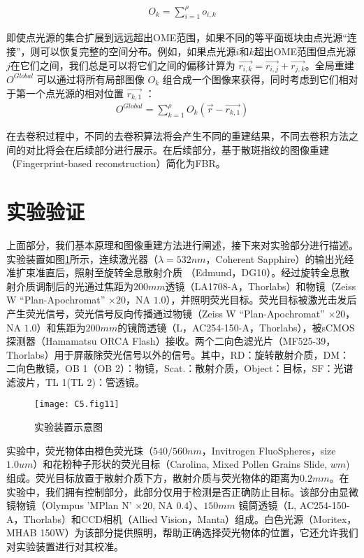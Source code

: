 \begin{equation}
		\begin{aligned}
O_{k} = \sum^{\rho}_{i=1}
o_{i,k}
\label{eq:5.5}
\end{aligned}
\end{equation}

即使点光源的集合扩展到远远超出OME范围，如果不同的等平面斑块由点光源“连接”，则可以恢复完整的空间分布。例如，如果点光源$i$和$k$超出OME范围但点光源$j$在它们之间，我们总是可以将它们之间的偏移计算为 $\vec{r_{i,k}} = \vec {r_{i,j}} + \vec{r_{j,k}}$。全局重建 $O^{Global}$ 可以通过将所有局部图像 $O_{k}$ 组合成一个图像来获得，同时考虑到它们相对于第一个点光源的相对位置 $\vec{r_{k,1}}$ ：
\begin{equation}
	\begin{aligned}
O^{Global} = \sum^{\rho}_{k=1}
O_{k}(\vec{r} - \vec{r_{k,1}})
\label{eq:5.6}
\end{aligned}
\end{equation}

在去卷积过程中，不同的去卷积算法将会产生不同的重建结果，不同去卷积方法之间的对比将会在后续部分进行展示。在后续部分，基于散斑指纹的图像重建（Fingerprint-based reconstruction）简化为FBR。

\section{实验验证}

上面部分，我们基本原理和图像重建方法进行阐述，接下来对实验部分进行描述。实验装置如图\ref{fig:5.11}所示，连续激光器（$\lambda  = 532 nm $，Coherent Sapphire）的输出光经准扩束准直后，照射至旋转全息散射介质 （Edmund，DG10）。经过旋转全息散射介质调制后的光通过焦距为$200 mm$透镜（LA1708-A，Thorlabs）和物镜（Zeiss W “Plan-Apochromat” $\times 20$，NA $1.0$），并照明荧光目标。荧光目标被激光击发后产生荧光信号，荧光信号反向传播通过物镜（Zeiss W “Plan-Apochromat” $\times 20$，NA $1.0$）和焦距为$200 mm$的镜筒透镜（L，AC254-150-A，Thorlabs），被sCMOS探测器（Hamamatsu ORCA Flash）接收。两个二向色滤光片（MF525-39，Thorlabs）用于屏蔽除荧光信号以外的信号。其中，RD：旋转散射介质，DM：二向色散镜，OB 1（OB 2）：物镜，Scat.：散射介质，Object：目标，SF：光谱滤波片，TL 1(TL 2)：管透镜。

\begin{figure}[htp]
	\centering
	\texttt{[image: C5.fig11]}
	\caption{实验装置示意图}
	\label{fig:5.11}
\end{figure}

实验中，荧光物体由橙色荧光珠（$540/560 nm$，Invitrogen FluoSpheres，size $1.0 um$）和花粉种子形状的荧光目标（Carolina, Mixed Pollen Grains Slide, $wm$)组成。荧光目标放置于散射介质下方，散射介质与荧光物体的距离为$0.2 mm$。在实验中，我们拥有控制部分，此部分仅用于检测是否正确防止目标。该部分由显微镜物镜（Olympus 'MPlan N' $\times 20$, NA $0.4$）、$ 150 mm$ 镜筒透镜（L, AC254-150-A，Thorlabs）和CCD相机（Allied Vision，Manta）组成。白色光源（Moritex，MHAB 150W）为该部分提供照明，帮助正确选择荧光物体的位置，它还允许我们对实验装置进行对其校准。
